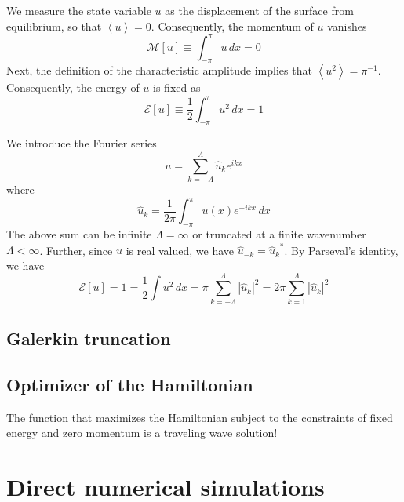 \documentclass[11pt]{article}
\newcommand{\np}{\newpage \noindent}
\newcommand{\abs}[1]{\left| #1 \right|}
\newcommand{\mean}[1]{\left< #1 \right>}
\newcommand{\dx}{\, dx}
\newcommand{\En}{\mathcal{E}}
\newcommand{\Mo}{\mathcal{M}}
\newcommand{\uhat}{\hat{u}}
\begin{document}
We measure the state variable $u$ as the displacement of the surface from equilibrium, so that $\mean{u} = 0$. Consequently, the momentum of $u$ vanishes
\begin{equation}
\Mo[u] \equiv \int_{-\pi}^{\pi} u \dx = 0
\end{equation}
Next, the definition of the characteristic amplitude implies that $\mean{u^2} = \pi^{-1}$. Consequently, the energy of $u$ is fixed as
\begin{equation}
\En[u] \equiv \frac{1}{2} \int_{-\pi}^{\pi} u^2 \dx = 1
\end{equation}

We introduce the Fourier series
\begin{equation}
u = \sum_{k=-\Lambda}^{\Lambda} \uhat_k e^{i k x}
\end{equation}
where
\begin{equation}
\uhat_k = \frac{1}{2 \pi} \int_{-\pi}^{\pi} u(x) e^{-i k x} \dx
\end{equation}
The above sum can be infinite $\Lambda = \infty$ or truncated at a finite wavenumber $\Lambda < \infty$.
Further, since $u$ is real valued, we have $\uhat_{-k} = {\uhat_{k}}^*$.
By Parseval's identity, we have
\begin{equation}
\En[u] = 1 = \frac{1}{2} \int u^2 \dx = \pi \sum_{k=-\Lambda}^{\Lambda} \abs{\uhat_k}^2 = 2 \pi \sum_{k=1}^{\Lambda} \abs{\uhat_k}^2
\end{equation}


\np
\subsection{Galerkin truncation}

\subsection{Optimizer of the Hamiltonian}
The function that maximizes the Hamiltonian subject to the constraints of fixed energy and zero momentum is a traveling wave solution!


\section{Direct numerical simulations}
\end{document}
